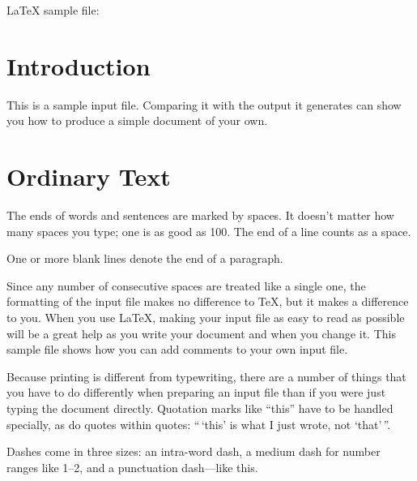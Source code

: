 

\LaTeX\xspace sample file:  

\section{Introduction}
This is a sample input file.  Comparing it with the output it
generates can show you how to produce a simple document of
your own.

\section{Ordinary Text}  %

The ends  of words and sentences are marked 
  by   spaces. It  doesn't matter how many 
spaces    you type; one is as good as 100.  The
end of   a line counts as a space.

One   or more   blank lines denote the  end 
of  a paragraph.  

Since any number of consecutive spaces are treated like a single
one, the formatting of the input file makes no difference to
      \TeX,         %
but it makes a difference to you.  
When you use
      \LaTeX,       %
making your input file as easy to read as possible
will be a great help as you write your document and when you
change it.  This sample file shows how you can add comments to
your own input file.

Because printing is different from typewriting, there are a 
number of things that you have to do differently when preparing 
an input file than if you were just typing the document directly.  
Quotation marks like 
       ``this'' 
have to be handled specially, as do quotes within quotes: 
       ``\,`this'                  %
        is what I just 
        wrote, not  `that'\,''.  

Dashes come in three sizes: an 
       intra-word 
dash, a medium dash for number ranges like 
       1--2, 
and a punctuation 
       dash---like 
this.

